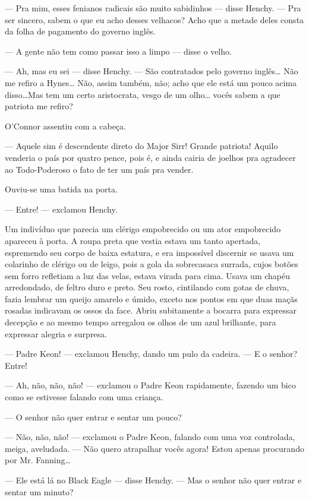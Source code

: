 --- Pra mim, esses fenianos radicais são muito sabidinhos --- disse
Henchy. --- Pra ser sincero, sabem o que eu acho desses velhacos?
Acho que a metade deles consta da folha de pagamento do governo
inglês.

--- A gente não tem como passar isso a limpo --- disse o velho.

--- Ah, mas eu sei --- disse Henchy. --- São contratados pelo governo
inglês\ldots{} Não me refiro a Hynes\ldots{} Não, assim também, não; acho que
ele está um pouco acima disso\ldots{}Mas tem um certo aristocrata, vesgo de
um olho\ldots{} vocês sabem a que patriota me refiro?

O'Connor assentiu com a cabeça.

--- Aquele sim é descendente direto do Major Sirr! Grande patriota!
Aquilo venderia o país por quatro pence, pois é, e ainda
cairia de joelhos pra agradecer ao Todo-Poderoso o fato de ter um país
pra vender.

Ouviu-se uma batida na porta.

--- Entre! --- exclamou Henchy.

Um indivíduo que parecia um clérigo empobrecido ou um ator empobrecido
apareceu à porta. A roupa preta que vestia estava um tanto apertada,
espremendo seu corpo de baixa estatura, e era impossível discernir se
usava um colarinho de clérigo ou de leigo, pois a gola da sobrecasaca
surrada, cujos botões sem forro refletiam a luz das velas, estava
virada para cima. Usava um chapéu arredondado, de feltro duro e preto.
Seu rosto, cintilando com gotas de chuva, fazia lembrar um queijo
amarelo e úmido, exceto nos pontos em que duas maçãs rosadas indicavam
os ossos da face. Abriu subitamente a bocarra para expressar decepção
e ao mesmo tempo arregalou os olhos de um azul brilhante, para
expressar alegria e surpresa.

--- Padre Keon! --- exclamou Henchy, dando um pulo da cadeira. --- E o
senhor? Entre!

--- Ah, não, não, não! --- exclamou o Padre Keon rapidamente, fazendo um
bico como se estivesse falando com uma criança.

--- O senhor não quer entrar e sentar um pouco?

--- Não, não, não! --- exclamou o Padre Keon, falando com uma voz
controlada, meiga, aveludada. --- Não quero atrapalhar vocês agora!
Estou apenas procurando por Mr. Fanning\ldots{}

--- Ele está lá no Black Eagle --- disse Henchy. --- Mas o senhor não
quer entrar e sentar um minuto?

